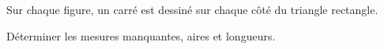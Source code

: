     Sur chaque figure, un carré est dessiné sur chaque côté du triangle rectangle.

    Déterminer les mesures manquantes, aires et longueurs.

    \hspace*{-8mm}
    \vspace*{-2mm}

